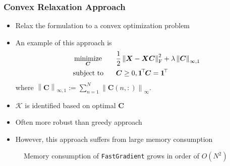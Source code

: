 \documentclass[10pt,xcolor={usenames,dvipsnames,table}]{beamer}
\def\red{\color{red}}
\def\blue{\color{blue}}
\newcommand{\norm}[1]{\left\lVert#1\right\rVert}
\newcommand{\T}{\!\top\!}
\DeclareMathOperator*{\minimize}{minimize}
\newcommand{\citep}[1]{{\blue \scriptsize \parencite{#1}}}
\begin{document}
\begin{frame}
    \frametitle{Convex Relaxation Approach}
    \begin{itemize}
        \item Relax the formulation to a convex optimization problem \citep{gillis2018afast,gillis2014robust,gillis2013robustness,recht2012factoring,Elhamifar2012,Ammanouil2014blind}
        \item An example of this approach is \citep{esser2012convex,fu2015robust}
    \begin{alignat*}{2}
        & \minimize_{\bm{C}} \quad && \dfrac{1}{2} \norm{\bm{X} - \bm{X}\bm{C}}_{\rm F}^2 + \lambda \norm{\bm{C}}_{\infty, 1} \\
        & \text{\rm subject to} && \bm{C} \geq 0, \bm{1}^{\T}\bm{C} = \bm{1}^{\T}
    \end{alignat*}
    where $\norm{\bm{C}}_{\infty, 1} := \sum^{N}_{n=1} \norm{\bm{C}(n, :)}_{\infty}$.
\item $\mathcal{K}$ is identified based on optimal $\bm{C}$
\item Often more robust than greedy approach
\item However, this approach suffers from large memory consumption
    \end{itemize}

    \begin{figure}
    \caption*{Memory consumption of \texttt{FastGradient} \citep{gillis2018afast} grows in order of $O(N^2)$ }
    \end{figure}


\end{frame}
\end{document}
